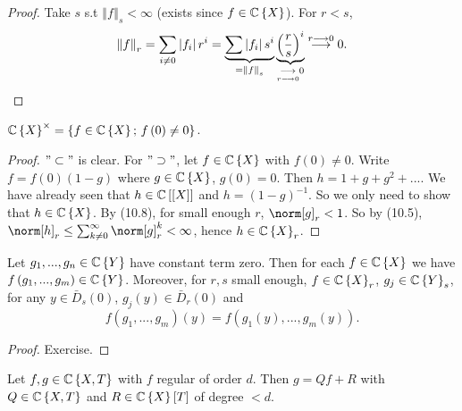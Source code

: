 \begin{proof}
Take $s$ s.t $\left\Vert f\right\Vert _{s}<\infty$ (exists since
$f\in\mathbb{C}\left\{ X\right\} $). For $r<s$, 
\[
\left\Vert f\right\Vert _{r}=\sum_{i\neq0}\left|f_{i}\right|r^{i}=\underbrace{\sum\left|f_{i}\right|s^{i}}_{=\left\Vert f\right\Vert _{s}}\underbrace{\left(\frac{r}{s}\right)^{i}}_{\underset{r\longrightarrow0}{\longrightarrow}0}\overset{r\longrightarrow0}{\longrightarrow}0.
\]
\end{proof}
\begin{cor*}
\label{10.9} $\mathbb{C}\left\{ X\right\} ^{\times}=\left\{ f\in\mathbb{C}\left\{ X\right\} ;\, f\left(0\right)\neq0\right\} $.\end{cor*}
\begin{proof}
$"\subset"$ is clear. For $"\supset"$, let $f\in\mathbb{C}\left\{ X\right\} $
with $f\left(0\right)\neq0$. Write $f=f\left(0\right)\left(1-g\right)$
where $g\in\mathbb{C}\left\{ X\right\} $, $g\left(0\right)=0$. Then $h=1+g+g^{2}+...$.
We have already seen that $h\in\mathbb{C}\left[\left[X\right]\right]$ and
$h=\left(1-g\right)^{-1}$. So we only need to show that $h\in\mathbb{C}\left\{ X\right\} $.
By (10.8), for small enough $r$, $\norm[g]_{r}<1$. So by (10.5),
$\norm[h]_{r}\leq\sum_{k\neq0}^{\infty}\norm[g]_{r}^{k}<\infty$,
hence $h\in\mathbb{C}\left\{ X\right\} _{r}$.\end{proof}
\begin{lem*}
\label{10.10} Let $g_{1},...,g_{n}\in\mathbb{C}\left\{ Y\right\} $ have constant
term zero. Then for each $f\in\mathbb{C}\left\{ X\right\} $ we have $f\left(g_{1},...,g_{m}\right)\in\mathbb{C}\left\{ Y\right\} $.
Moreover, for $r,s$ small enough, $f\in\mathbb{C}\left\{ X\right\} _{r}$,
$g_{j}\in\mathbb{C}\left\{ Y\right\} _{s}$, for any $y\in\bar{D}_{s}\left(0\right)$,
$g_{j}\left(y\right)\in\bar{D}_{r}\left(0\right)$ and
\[
f\left(g_{1},...,g_{m}\right)\left(y\right)=f\left(g_{1}\left(y\right),...,g_{m}\left(y\right)\right).
\]
\end{lem*}
\begin{proof}
Exercise.\end{proof}
\begin{thm*}
\label{10.11} Let $f,g\in\mathbb{C}\left\{ X,T\right\} $ with $f$ regular of order
$d$. Then $g=Qf+R$ with $Q\in\mathbb{C}\left\{ X,T\right\} $ and $R\in\mathbb{C}\left\{ X\right\} \left[T\right]$
of degree $<d$.\end{thm*}
